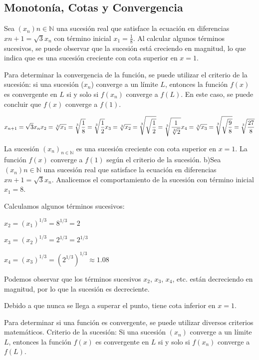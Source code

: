 \documentclass{article}
\begin{document}
    \subsection{Monotonía, Cotas y Convergencia}

Sea $(x_n){n \in \mathbb{N}}$ una sucesión real que satisface la ecuación en diferencias $x{n+1} = \sqrt{3}x_n$ con término inicial $x_1 = \frac{1}{8}$. Al calcular algunos términos sucesivos, se puede observar que la sucesión está creciendo en magnitud, lo que indica que es una sucesión creciente con cota superior en $x = 1$.

Para determinar la convergencia de la función, se puede utilizar el criterio de la sucesión: si una sucesión ($x_{n}$) converge a un límite $L$, entonces la función $f(x)$ es convergente en $L$ si y solo si $f(x_{n})$ converge a $f(L)$. En este caso, se puede concluir que $f(x)$ converge a $f(1)$.

\begin{equation}
    x_{n+1} = \sqrt{3}x_n \\
    x_2 = \sqrt[3]{x_1} = \sqrt[3]{\frac{1}{8}} = \sqrt[3]{\frac{1}{2}} \\
    x_3 = \sqrt[3]{x_2} = \sqrt[3]{\sqrt{\frac{1}{2}}} = \sqrt[3]{\frac{1}{\sqrt[3]{2}}} \\
    x_4 = \sqrt[3]{x_3} = \sqrt[3]{\sqrt{\frac{9}{8}}} = \sqrt[3]{\frac{27}{8}}
\end{equation}

La sucesión $(x_n)_{n \in \mathbb{N}}$ es una sucesión creciente con cota superior en $x = 1$. La función $f(x)$ converge a $f(1)$ según el criterio de la sucesión.
b)Sea $(x_n){n \in \mathbb{N}}$ una sucesión real que satisface la ecuación en diferencias $x{n+1} = \sqrt{3}x_n$. Analicemos el comportamiento de la sucesión con término inicial $x_1 = 8$.

Calculamos algunos términos sucesivos:

$x_2 = (x_1)^{1/3} = 8^{1/3} = 2$

$x_3 = (x_2)^{1/3} = 2^{1/3} = 2^{1/3}$

$x_4 = (x_3)^{1/3} = (2^{1/3})^{1/3} \approx 1.08$

Podemos observar que los términos sucesivos $x_2$, $x_3$, $x_4$, etc. están decreciendo en magnitud, por lo que la sucesión es decreciente.

Debido a que nunca se llega a superar el punto, tiene cota inferior en $x = 1$.

Para determinar si una función es convergente, se puede utilizar diversos criterios matemáticos. Criterio de la sucesión: Si una sucesión $(x_n)$ converge a un límite $L$, entonces la función $f(x)$ es convergente en $L$ si y solo si $f(x_n)$ converge a $f(L)$.
\end{document}

